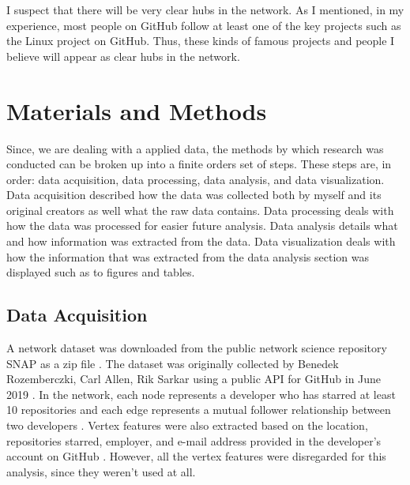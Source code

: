 \documentclass[9pt,twocolumn,twoside]{pnas-new}
\begin{document}
I suspect that there will be very clear hubs in the network. As I mentioned, in my experience, most people on GitHub follow at least one of the key projects such as the Linux project on GitHub. Thus, these kinds of famous projects and people I believe will appear as clear hubs in the network.

\section{Materials and Methods}{
Since, we are dealing with a applied data, the methods by which research was conducted can be broken up into a finite orders set of steps. These steps are, in order: data acquisition, data processing, data analysis, and data visualization. Data acquisition described how the data was collected both by myself and its original creators as well what the raw data contains. Data processing deals with how the data was processed for easier future analysis. Data analysis details what and how information was extracted from the data. Data visualization deals with how the information that was extracted from the data analysis section was displayed such as to figures and tables.

\subsection{Data Acquisition} A network dataset was downloaded from the public network science repository SNAP as a zip file \cite{rozemberczki2019multiscale}. The dataset was originally collected by Benedek Rozemberczki, Carl Allen, Rik Sarkar using a public API for GitHub in June 2019 \cite{rozemberczki2019multiscale}. In the network, each node represents a developer who has starred at least 10 repositories and each edge represents a mutual follower relationship between two developers \cite{rozemberczki2019multiscale}. Vertex features were also extracted based on the location, repositories starred, employer, and e-mail address provided in the developer’s account on GitHub \cite{rozemberczki2019multiscale}. However, all the vertex features were disregarded for this analysis, since they weren’t used at all.

}
\end{document}
